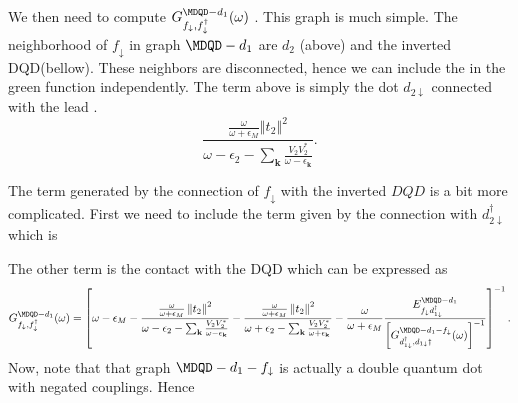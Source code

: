 \documentclass[showpacs,aps,prb,reprint,superscriptaddress]{revtex4-1}
\begin{document}
\begin{widetext}
We then need to compute $\GreenG{f_{\downarrow},f_{\downarrow}^{\dagger}}{\MDQD-d_{1}}$ . This graph is much simple. The neighborhood of  $f_{\downarrow}$ in graph ${\MDQD-d_{1}}$ are $d_2$ (above) and the inverted DQD(bellow). These neighbors are disconnected, hence we can include the in the green function independently. The term above is simply the dot $d_{2\downarrow}$ connected with the lead . 
\begin{equation}
    \frac{\frac{\omega}{\omega+\epsilon_{M}}\left\Vert t_{2}\right\Vert ^{2}}{\omega-\epsilon_{2}-\sum_{\mathbf{k}}\frac{V_{2}V_{2}^{*}}{\omega-\epsilon_{\mathbf{k}}}}.
\end{equation}

 
The term generated by the connection of $f_{\downarrow}$  with the inverted $DQD$ is a bit more complicated. First we need to include the term given by the connection with  $d_{2\downarrow}^\dagger$ which is 

The other term is the contact with the DQD which can be expressed as 
\begin{equation}
    \GreenG{f_{\downarrow},f_{\downarrow}^{\dagger}}{\MDQD-d_{1}}=\left[\omega-\epsilon_{M}-\frac{\frac{\omega}{\omega+\epsilon_{M}}\left\Vert t_{2}\right\Vert ^{2}}{\omega-\epsilon_{2}-\sum_{\mathbf{k}}\frac{V_{2}V_{2}^{*}}{\omega-\epsilon_{\mathbf{k}}}}-\frac{\frac{\omega}{\omega+\epsilon_{M}}\left\Vert t_{2}\right\Vert ^{2}}{\omega+\epsilon_{2}-\sum_{\mathbf{k}}\frac{V_{2}V_{2}^{*}}{\omega+\epsilon_{\mathbf{k}}}}-\frac{\omega}{\omega+\epsilon_{M}}\frac{E_{f_{\dw}d_{1\dw}^\dagger}^{\MDQD-d_1}}{\left[\GreenG{d_{1\downarrow}^{\dagger},d_{1\downarrow}{\dagger}}{\MDQD-d_{1}-f_{\downarrow}}\right]^{-1}}\right]^{-1}.
\end{equation}
Now, note that that graph $\MDQD-d_{1}-f_{\downarrow}$ is actually a double quantum dot with negated couplings. Hence 
\end{widetext}
\end{document}
